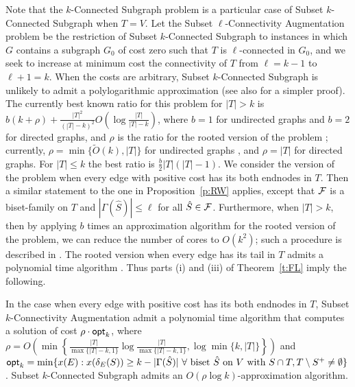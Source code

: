 \vspace{0.1cm}

Note that the {\sf $k$-Connected Subgraph} problem is a particular case of 
{\sf Subset $k$-Connected Subgraph} when $T=V$.
Let the {\sf Subset $\ell$-Connectivity Augmentation} problem be the restriction of 
{\sf Subset $k$-Connected Subgraph} to instances in which $G$ contains a 
subgraph $G_0$ of cost zero such that $T$ is $\ell$-connected in $G_0$,
and we seek to increase at minimum cost
the connectivity of $T$ from $\ell=k-1$ to $\ell+1=k$. 
When the costs are arbitrary, {\sf Subset $k$-Connected Subgraph} is unlikely to admit 
a polylogarithmic approximation \cite{KKL} (see also \cite{LN} for a simpler proof).
The currently best known ratio for this problem for $|T|>k$ is
$b(k+\rho)+\frac{|T|^2}{{(|T|-k)}^2} O\left(\log \frac{|T|}{|T|-k}\right)$,
where $b=1$ for undirected graphs and $b=2$ for directed graphs, and
$\rho$ is the ratio for the rooted version of the problem \cite{L-subs,N-subs}; 
currently, $\rho=\min\{\tilde{O}(k),|T|\}$ for undirected graphs \cite{N-focs}, and 
$\rho=|T|$ for directed graphs. For $|T| \leq k$ the best ratio is $\frac{b}{2}|T|(|T|-1)$.
We consider the version of the problem when every edge with positive cost has its both endnodes
in $T$. Then a similar statement to the one in Proposition~\ref{p:RW} applies, 
except that ${\cal F}$ is a biset-family on $T$ and $|\Gamma(\hat{S})| \leq \ell$ for all $\hat{S} \in {\cal F}$.
Furthermore, when $|T|>k$, then by applying $b$ times an approximation algorithm for
the rooted version of the problem, we can reduce the number of cores to $O(k^2)$;
such a procedure is described in \cite{L-subs,N-subs}.
The rooted version when every edge has its tail in $T$ admits a polynomial time algorithm \cite{F-R}.
Thus parts (i) and (iii) of Theorem~\ref{t:FL} imply the following.

\begin{corollary} \label{t:aug'}
In the case when every edge with positive cost has its both endnodes in $T$,
{\sf Subset $k$-Connectivity Augmentation} admit a polynomial time algorithm that computes a solution 
of cost $\rho \cdot {\sf opt}_k$, where 
$\rho=
O\left(\min\left\{\frac{|T|}{\max\{|T|-k,1\}} \log \frac{|T|}{\max\{|T|-k,1\}},\log \min\{k,|T|\}\right\}\right)$
and ${\sf opt}_k=\min\{x(E): x(\delta_E(S)) \geq k-|\Gamma(\hat{S})| \ 
\forall \mbox{ biset } \hat{S} \mbox{ on } V \mbox{ with } 
S \cap T,T \setminus S^+ \neq \emptyset\}$.
{\sf Subset $k$-Connected Subgraph} admits an $O(\rho \log k)$-approximation algorithm.
\end{corollary}

